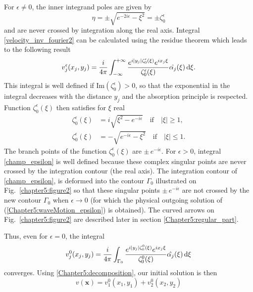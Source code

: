 For  $\epsilon \neq 0$, the inner integrand poles are given by
\begin{equation}
 \eta = \pm \sqrt{e^{-2i\epsilon} - \xi^2}  = \pm \zeta_0^\epsilon
\end{equation} 
and are never crossed by integration along the real axis. Integral \eqref{velocity_inv_fourier2} can be calculated using the residue theorem which leads to the following result
\begin{equation}
\label{champ_epsilon}
v_j^\epsilon(x_j,y_j) = \dfrac{i}{4\pi} \int_{-\infty}^{+\infty}  \dfrac{e^{i|y_j|\zeta_0^\epsilon(\xi)} e^{i x_j \xi}}{\zeta_0^\epsilon(\xi)} \hat{\alpha_j}(\xi) \, {\rm d}\xi.
\end{equation}
This integral is well defined if $\text{Im}(\zeta_0^\epsilon) > 0$, so that the exponential in the integral decreases with the distance $y_j$ and the absorption principle is respected. Function $\zeta_0^\epsilon(\xi)$ then satisfies for $\xi$ real
\begin{subequations}
\label{zeta_function}
\begin{align}
\zeta_0^\epsilon(\xi)&= i\sqrt{\xi^2-e^{-i\epsilon}} \quad \text{if} \quad \vert \xi\vert \geq 1,\\
\label{zeta_function_inferior1}
\zeta_0^\epsilon(\xi)&= -\sqrt{e^{-i\epsilon}-\xi^2} \quad  \text{if} \quad \vert \xi\vert \leq 1.
\end{align}
\end{subequations}
The branch points of the function $\zeta_0^\epsilon(\xi)$ are $\pm  \, e^{-i\epsilon}$. For $\epsilon > 0$, integral \eqref{champ_epsilon} is well defined because these complex singular points are never crossed by the integration contour (the real axis). The integration contour of \eqref{champ_epsilon}, is deformed into the contour $\Gamma_0$ illustrated on Fig.~\ref{chapter5:figure2} so that these singular points $\pm  \, e^{-i\epsilon}$ are not crossed by the new contour $\Gamma_0$  when $\epsilon \rightarrow 0$ (for which the physical outgoing solution of (\ref{Chapter5:waveMotion_epsilon}) is obtained). The curved arrows on Fig.~\ref{chapter5:figure2} are described later in section \ref{Chapter5:regular_part}.

Thus, even for $\epsilon=0$, the integral
\begin{equation}
\label{champ}
v_j^0(x_j,y_j) = \dfrac{i}{4\pi} \int_{\Gamma_0}  \dfrac{e^{i|y_j|\zeta_0^0(\xi)} e^{i x_j \xi}}{\zeta_0^0(\xi)} \hat{\alpha_j}(\xi)  \, {\rm d}\xi
\end{equation}
converges.
Using \eqref{Chapter5:decomposition}, our initial solution is then
\begin{equation}
\label{initial_sol}
v(\mathbf{x}) = v_1^0(x_1,y_1) + v_2^0(x_2,y_2)
\end{equation}

